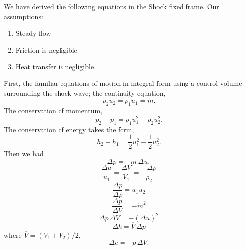 
\lecture{}

\begin{recall}
We have derived the following equations in the Shock fixed frame.
Our assumptions:
\begin{enumerate}
\item Steady flow
\item Friction is negligible
\item Heat transfer is negligible.
\end{enumerate}
First, the familiar equations of motion in integral form using a
control volume surrounding the shock wave; the continuity equation,
\begin{equation}\label{eq:me101a:fall2026:lec21:eq1}
\rho_{2}u_{2}=\rho_{1}u_{1}=\dot{m}.
\end{equation}
The conservation of momentum,
\begin{equation}\label{eq:me101a:fall2026:lec21:eq2}
p_{2}-p_{1}=\rho_{1}u_{1}^{2}-\rho_{2}u_{2}^{2}.
\end{equation}
The conservation of energy takes the form,
\begin{equation}\label{eq:me101a:fall2026:lec21:eq3}
h_{2}-h_{1}=\frac{1}{2}u_{1}^{2}-\frac{1}{2}u_{2}^{2}.
\end{equation}
Then we had
\begin{equation}\label{eq:me101a:fall2026:lec21:eq4}
\Delta p = -\dot{m}\,\Delta u,
\end{equation}
\begin{equation}\label{eq:me101a:fall2026:lec21:eq5}
\frac{\Delta u}{u_{1}}=\frac{\Delta V}{V_{1}}=\frac{-\Delta\rho}{\rho_{2}}
\end{equation}
\begin{equation}\label{eq:me101a:fall2026:lec21:eq6}
\frac{\Delta p}{\Delta\rho}=u_{1}u_{2}
\end{equation}
\begin{equation}\label{eq:me101a:fall2026:lec21:eq7}
\frac{\Delta p}{\Delta V}=-\dot{m}^{2}
\end{equation}
\begin{equation}\label{eq:me101a:fall2026:lec21:eq8}
\Delta p\,\Delta V=-(\Delta u)^{2}
\end{equation}
\begin{equation}\label{eq:me101a:fall2026:lec21:eq9}
\Delta h = \overline{V}\,\Delta p
\end{equation}
where $\overline{V}=(V_{1}+V_{2})/2$,
\begin{equation}\label{eq:me101a:fall2026:lec21:eq10}
\Delta e=-\overline{p}\,\Delta V.
\end{equation}
\end{recall}

